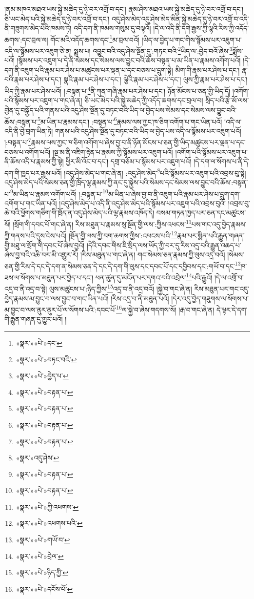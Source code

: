 །ནམ་མཁའ་མཐའ་ཡས་སྐྱེ་མཆེད་དུ་ཉེ་བར་འགྲོ་བ་དང་། རྣམ་ཤེས་མཐའ་ཡས་སྐྱེ་མཆེད་དུ་ཉེ་བར་འགྲོ་བ་དང་། ཅི་ཡང་མེད་པའི་སྐྱེ་མཆེད་དུ་ཉེ་བར་འགྲོ་བ་དང་། འདུ་ཤེས་མེད་འདུ་ཤེས་མེད་མིན་སྐྱེ་མཆེད་དུ་ཉེ་བར་འགྲོ་བ་འདི་ནི་གཟུགས་མེད་པའི་ཁམས་ཏེ། འདི་དག་ནི་ཁམས་གསུམ་དུ་བལྟའོ། །དེ་ལ་འདི་ནི་དགེ་རྒྱས་ཀྱི་ལྷའི་རིས་ཀྱི་འདོད་ཆགས་:དང་བྲལ་ལ། གོང་མའི་འདོད་ཆགས་དང་\footnote{«སྣར་»«པེ་»དང་}མ་བྲལ་བའོ། །ཡིད་ལ་བྱེད་པ་གང་གིས་སྙོམས་པར་འཇུག་པ་འདི་ལ་སྙོམས་པར་འཇུག་ཅེ་ན། སྨྲས་པ། འབྱུང་བའི་འདུ་ཤེས་སྔོན་དུ་:གཏང་བའི་\footnote{«སྣར་»«པེ་»བཏང་བའི་}ཡིད་ལ་:བྱེད་བའོ་ཞེས་\footnote{«སྣར་»«པེ་»བྱེད་པ་}སྨོས་པའོ། །སྙོམས་པར་འཇུག་པ་དེ་ནི་སེམས་དང་སེམས་ལས་བྱུང་བའི་ཆོས་བསྟན་པ་མ་ཡིན་པ་རྣམས་འགོག་པའོ། །དེ་དག་ནི་འཇུག་པའི་རྣམ་པར་ཤེས་པ་མཚུངས་པར་ལྡན་པ་དང་བཅས་པ་དྲུག་སྟེ། མིག་གི་རྣམ་པར་ཤེས་པ་དང་། རྣ་བའི་རྣམ་པར་ཤེས་པ་དང་། སྣའི་རྣམ་པར་ཤེས་པ་དང་། ལྕེའི་རྣམ་པར་ཤེས་པ་དང་། ལུས་ཀྱི་རྣམ་པར་ཤེས་པ་དང་། ཡིད་ཀྱི་རྣམ་པར་ཤེས་པའོ། །:བསྟན་པ་\footnote{«སྣར་»«པེ་»བརྟན་པ་}ནི་ཀུན་གཞི་རྣམ་པར་ཤེས་པ་དང་། ཉོན་མོངས་པ་ཅན་གྱི་ཡིད་དོ། །འགོག་པའི་སྙོམས་པར་འཇུག་པ་གང་ཞེ་ན། ཅི་ཡང་མེད་པའི་སྐྱེ་མཆེད་ཀྱི་འདོད་ཆགས་དང་བྲལ་བ། སྲིད་པའི་རྩེ་མོ་ལས་གྱེན་དུ་བསྐྱོད་པའི་གནས་པའི་འདུ་ཤེས་སྔོན་དུ་བཏང་བའི་ཡིད་ལ་བྱེད་པས་སེམས་དང་སེམས་ལས་བྱུང་བའི་ཆོས་:བསྟན་པ་\footnote{«སྣར་»«པེ་»བརྟན་པ་}མ་ཡིན་པ་རྣམས་དང་། :བསྟན་པ་\footnote{«སྣར་»«པེ་»བརྟན་པ་}རྣམས་ལས་ཀྱང་ཁ་ཅིག་འགོག་པ་གང་ཡིན་པའོ། །འདི་ལ་འདི་ནི་བྱེ་བྲག་ཡིན་ཏེ། གནས་པའི་འདུ་ཤེས་སྔོན་དུ་བཏང་བའི་ཡིད་ལ་བྱེད་པས་འདི་ལ་སྙོམས་པར་འཇུག་པའོ། །:བསྟན་པ་\footnote{«སྣར་»«པེ་»བརྟན་པ་}རྣམས་ལས་ཀྱང་ཁ་ཅིག་འགོག་པ་ཞེས་བྱ་བ་ནི་ཉོན་མོངས་པ་ཅན་གྱི་ཡིད་མཚུངས་པར་ལྡན་པ་དང་བཅས་པ་འགོག་པའོ། །སྔ་མ་ནི་འཇིག་རྟེན་པ་རྣམས་ཀྱི་སྙོམས་པར་འཇུག་པའོ། །འགོག་པའི་སྙོམས་པར་འཇུག་པ་ནི་ཆོས་འདི་པ་རྣམས་ཀྱི་སྟེ། ཕྱིར་མི་འོང་བ་དང་། དགྲ་བཅོམ་པ་སྙོམས་པར་འཇུག་པའོ། །དེ་དག་ལ་སོགས་པ་ནི་དེ་དག་གི་ཁྱད་པར་རྒྱས་པའོ། །འདུ་ཤེས་མེད་པ་གང་ཞེ་ན། :འདུ་ཤེས་མེད་\footnote{«སྣར་»འདུ་ཤེས་}པའི་སྙོམས་པར་འཇུག་པའི་འབྲས་བུ་སྟེ། འདུ་ཤེས་མེད་པའི་སེམས་ཅན་གྱི་ཁྲོད་ལྷ་རྣམས་ཀྱི་ནང་དུ་སྐྱེས་པའི་སེམས་དང་སེམས་ལས་བྱུང་བའི་ཆོས་:བསྟན་པ་\footnote{«སྣར་»«པེ་»བརྟན་པ་}མ་ཡིན་པ་རྣམས་འགོག་པའོ། །:བསྟན་པ་\footnote{«སྣར་»«པེ་»བརྟན་པ་}མ་ཡིན་པ་ཞེས་བྱ་བ་ནི་འཇུག་པའི་རྣམ་པར་ཤེས་པ་དྲུག་དག་འགོག་པ་གང་ཡིན་པའོ། །འདུ་ཤེས་མེད་པ་འདི་ནི་འདུ་ཤེས་མེད་པའི་སྙོམས་པར་འཇུག་པའི་འབྲས་བུའོ། །འབྲས་བུ་ཆེ་བའི་ཕྱོགས་གཅིག་གི་ཁྲོད་ན་འདུ་ཤེས་མེད་པའི་ལྷ་རྣམས་འཁོད་དེ། བསམ་གཏན་ཁྱད་པར་ཅན་དང་མཚུངས་སོ། །སྲོག་གི་དབང་པོ་གང་ཞེ་ན། རིས་མཐུན་པ་རྣམས་སུ་སྔོན་གྱི་ལས་:ཀྱིས་འཕངས་\footnote{«སྣར་»«པེ་»ཀྱི་འཕགས་}པས་གང་འདུ་བྱེད་རྣམས་ཀྱི་གནས་པའི་དུས་ངེས་པའོ། །སྔོན་གྱི་ལས་ཀྱི་བག་ཆགས་ཀྱིས་:འཕངས་པའི་\footnote{«སྣར་»«པེ་»འཕགས་པའི་}རྣམ་པར་སྨིན་པའི་རྒྱུན་གཞན་གྱི་མཐུ་ལ་སྲོག་གི་དབང་པོ་ཞེས་བྱའོ། །དེའི་དབང་གིས་ཇི་སྲིད་ལས་ཡོད་ཀྱི་བར་དུ་རིས་འདྲ་བའི་རྒྱུན་འཆད་པ་ཞེས་བྱ་བའི་འཆི་བར་མི་འགྱུར་རོ། །རིས་མཐུན་པ་གང་ཞེ་ན། གང་སེམས་ཅན་རྣམས་ཀྱི་ལུས་འདྲ་བའོ། །སེམས་ཅན་གྱི་རིས་དེ་དང་དེ་དག་ན་སེམས་ཅན་དེ་དང་དེ་དག་གི་ལུས་དང་དབང་པོ་དང་དབྱིབས་དང་:གཡོ་བ་དང་\footnote{«སྣར་»«པེ་»གཡོ་བ་}ཁ་ཟས་ལ་སོགས་པ་མཐུན་པར་བྱེད་པ་དང་། ཕན་ཚུན་དུ་མངོན་པར་དགའ་བའི་འབྲེལ་\footnote{«སྣར་»«པེ་»བྲེལ་}པའི་རྒྱུའོ། །དེ་ལ་འགྲོ་བ་འདྲ་བ་ནི་འདྲ་བ་སྟེ། ལུས་མཚུངས་པ་:ཉིད་ཀྱིས་\footnote{«སྣར་»«པེ་»ཉིད་ཀྱི་}འདྲ་བ་ནི་འདྲ་བའོ། །སྐྱེ་བ་གང་ཞེ་ན། རིས་མཐུན་པར་གང་འདུ་བྱེད་རྣམས་མ་བྱུང་བ་ལས་བྱུང་བ་གང་ཡིན་པའོ། །རིས་འདྲ་བ་ནི་མཐུན་པའོ། །དེར་འདུ་བྱེད་གཟུགས་ལ་སོགས་པ་མ་བྱུང་བ་ལས་ནུར་ནུར་པོ་ལ་སོགས་པའི་:དབང་པོ་\footnote{«སྣར་»«པེ་»དངོས་པོ་}ལ་སྐྱེ་བ་ཞེས་གདགས་སོ། །རྒ་བ་གང་ཞེ་ན། དེ་ལྟར་དེ་དག་གི་རྒྱུན་གཞན་དུ་གྱུར་པའོ། །
